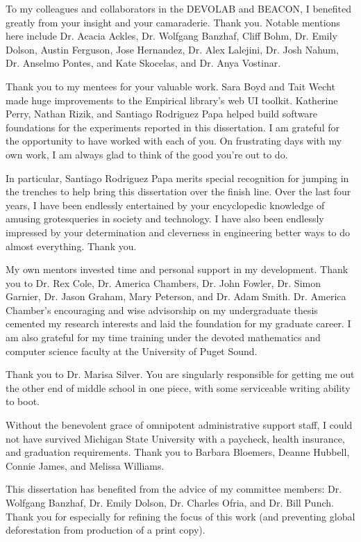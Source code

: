 To my colleagues and collaborators in the DEVOLAB and BEACON, I benefited greatly from your insight and your camaraderie.
Thank you.
Notable mentions here include Dr. Acacia Ackles, Dr. Wolfgang Banzhaf, Cliff Bohm, Dr. Emily Dolson, Austin Ferguson, Jose Hernandez, Dr. Alex Lalejini, Dr. Josh Nahum, Dr. Anselmo Pontes, and Kate Skocelas, and Dr. Anya Vostinar.

Thank you to my mentees for your valuable work.
Sara Boyd and Tait Wecht made huge improvements to the Empirical library's web UI toolkit.
Katherine Perry, Nathan Rizik, and Santiago Rodriguez Papa helped build software foundations for the experiments reported in this dissertation.
I am grateful for the opportunity to have worked with each of you.
On frustrating days with my own work, I am always glad to think of the good you're out to do.

In particular, Santiago Rodriguez Papa merits special recognition for jumping in the trenches to help bring this dissertation over the finish line.
Over the last four years, I have been endlessly entertained by your encyclopedic knowledge of amusing grotesqueries in society and technology.
I have also been endlessly impressed by your determination and cleverness in engineering better ways to do almost everything.
Thank you.

My own mentors invested time and personal support in my development.
Thank you to Dr. Rex Cole, Dr. America Chambers, Dr. John Fowler, Dr. Simon Garnier, Dr. Jason Graham, Mary Peterson, and Dr. Adam Smith.
Dr. America Chamber's encouraging and wise advisorship on my undergraduate thesis cemented my research interests and laid the foundation for my graduate career.
I am also grateful for my time training under the devoted mathematics and computer science faculty at the University of Puget Sound.

Thank you to Dr. Marisa Silver.
You are singularly responsible for getting me out the other end of middle school in one piece, with some serviceable writing ability to boot.

Without the benevolent grace of omnipotent administrative support staff, I could not have survived Michigan State University with a paycheck, health insurance, and graduation requirements.
Thank you to Barbara Bloemers, Deanne Hubbell, Connie James, and Melissa Williams.

This dissertation has benefited from the advice of my committee members: Dr. Wolfgang Banzhaf, Dr. Emily Dolson, Dr. Charles Ofria, and Dr. Bill Punch.
Thank you for especially for refining the focus of this work (and preventing global deforestation from production of a print copy).

